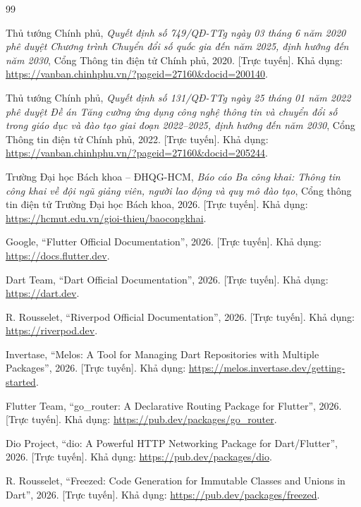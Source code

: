 \vspace{1cm}
\begin{thebibliography}{99}
\raggedright

    Thủ tướng Chính phủ, \textit{Quyết định số 749/QĐ-TTg ngày 03 tháng 6 năm 2020 phê duyệt Chương trình Chuyển đổi số quốc gia đến năm 2025, định hướng đến năm 2030}, Cổng Thông tin điện tử Chính phủ, 2020. [Trực tuyến]. Khả dụng:  \url{https://vanban.chinhphu.vn/?pageid=27160&docid=200140}.

    Thủ tướng Chính phủ, \textit{Quyết định số 131/QĐ-TTg ngày 25 tháng 01 năm 2022 phê duyệt Đề án Tăng cường ứng dụng công nghệ thông tin và chuyển đổi số trong giáo dục và đào tạo giai đoạn 2022--2025, định hướng đến năm 2030}, Cổng Thông tin điện tử Chính phủ, 2022. [Trực tuyến]. Khả dụng:  \url{https://vanban.chinhphu.vn/?pageid=27160&docid=205244}.

    Trường Đại học Bách khoa -- ĐHQG-HCM, \textit{Báo cáo Ba công khai: Thông tin công khai về đội ngũ giảng viên, người lao động và quy mô đào tạo}, Cổng thông tin điện tử Trường Đại học Bách khoa, 2026. [Trực tuyến]. Khả dụng:  \url{https://hcmut.edu.vn/gioi-thieu/baocongkhai}.

    Google, ``Flutter Official Documentation'', 2026. [Trực tuyến]. Khả dụng:  \url{https://docs.flutter.dev}.

    Dart Team, ``Dart Official Documentation'', 2026. [Trực tuyến]. Khả dụng:  \url{https://dart.dev}.

    R. Rousselet, ``Riverpod Official Documentation'', 2026. [Trực tuyến]. Khả dụng:  \url{https://riverpod.dev}.

    Invertase, ``Melos: A Tool for Managing Dart Repositories with Multiple Packages'', 2026. [Trực tuyến]. Khả dụng:  \url{https://melos.invertase.dev/getting-started}.

    Flutter Team, ``go\_router: A Declarative Routing Package for Flutter'', 2026. [Trực tuyến]. Khả dụng:  \url{https://pub.dev/packages/go_router}.

    Dio Project, ``dio: A Powerful HTTP Networking Package for Dart/Flutter'', 2026. [Trực tuyến]. Khả dụng:  \url{https://pub.dev/packages/dio}.

    R. Rousselet, ``Freezed: Code Generation for Immutable Classes and Unions in Dart'', 2026. [Trực tuyến]. Khả dụng:  \url{https://pub.dev/packages/freezed}.


\end{thebibliography}
